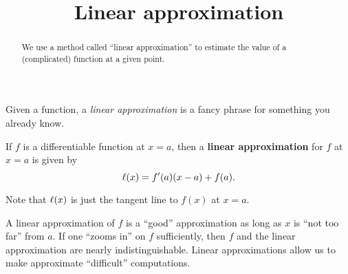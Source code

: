 \documentclass{ximera}
\title[Dig-In:]{Linear approximation}
\begin{document}
\begin{abstract}
We use a method called ``linear approximation'' to estimate the value
of a (complicated) function at a given point.
\end{abstract}
\maketitle


Given a function, a \textit{linear approximation} is a fancy phrase
for something you already know.

\begin{definition}
If $f$ is a differentiable function at $x=a$, then a \textbf{linear
  approximation} for $f$ at $x=a$ is given by
\[
\ell(x) = f'(a)(x-a) +f(a).
\]
\end{definition}


Note that $\ell(x)$ is just the tangent line to $f(x)$ at $x=a$.

A linear approximation of $f$ is a ``good'' approximation as long as
$x$ is ``not too far'' from $a$.
If one ``zooms in'' on $f$ sufficiently, then $f$ and the linear
approximation are nearly indistinguishable. Linear approximations
allow us to make approximate ``difficult'' computations.
\end{document}
